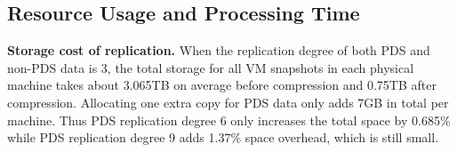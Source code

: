 \subsection{Resource Usage and Processing Time}


{\bf Storage cost of replication.} 
When the replication degree of both PDS and non-PDS data is 3, 
the total storage  for all VM snapshots in each physical machine takes about 3.065TB on average before compression
and 0.75TB after compression.  Allocating  one extra  copy for PDS data only adds  7GB in total per machine.
Thus PDS replication degree 6 only increases the total space by 0.685\% while PDS replication degree 9 adds 1.37\% 
space overhead, which is still small.

